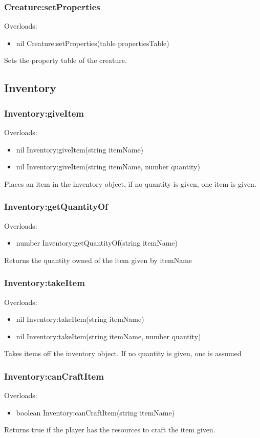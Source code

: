 \documentclass{book}
\newenvironment{ulist}
	{\begin{itemize}
			\itemsep0em}
	{\end{itemize}}
\begin{document}
\subsubsection{Creature:setProperties}
Overloads:
\begin{ulist}
	\item nil Creature:setProperties(table propertiesTable)
\end{ulist}
Sets the property table of the creature.

\subsection{Inventory}
\subsubsection{Inventory:giveItem}
Overloads:
\begin{ulist}
	\item nil Inventory:giveItem(string itemName)
	\item nil Inventory:giveItem(string itemName, number quantity)
\end{ulist}
Places an item in the inventory object, if no quantity is given, one item is given.

\subsubsection{Inventory:getQuantityOf}
Overloads:
\begin{ulist}
	\item number Inventory:getQuantityOf(string itemName)
\end{ulist}
Returns the quantity owned of the item given by itemName

\subsubsection{Inventory:takeItem}
Overloads:
\begin{ulist}
	\item nil Inventory:takeItem(string itemName)
	\item nil Inventory:takeItem(string itemName, number quantity)
\end{ulist}
Takes items off the inventory object. If no quantity is given, one is assumed

\subsubsection{Inventory:canCraftItem}
Overloads:
\begin{ulist}
	\item boolean Inventory:canCraftItem(string itemName)
\end{ulist}
Returns true if the player has the resources to craft the item given.
\end{document}
